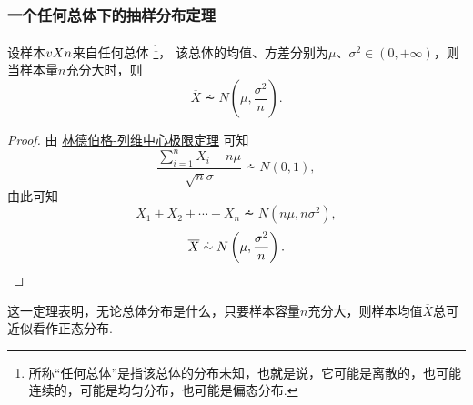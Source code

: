 \subsubsection{一个任何总体下的抽样分布定理}
\begin{theorem}
设样本\(v{X}{n}\)来自任何总体%
\footnote{所称“任何总体”是指该总体的分布未知，也就是说，它可能是离散的，也可能连续的，可能是均匀分布，也可能是偏态分布.}，%
该总体的均值、方差分别为\(\mu\)、\(\sigma^2\in(0,+\infty)\)，则当样本量\(n\)充分大时，则\begin{equation}
\overline{X} \dotsim N\left(\mu,\frac{\sigma^2}{n}\right).
\end{equation}
\begin{proof}
由 \hyperref[theorem:极限定理.林德伯格-列维中心极限定理]{林德伯格-列维中心极限定理} 可知\[
\frac{\sum\limits_{i=1}^n X_i - n\mu}{\sqrt{n} \sigma} \dotsim N(0,1),
\]由此可知\[
X_1+X_2+\dotsb+X_n \dotsim N(n\mu,n\sigma^2),
\]\[
\overline{X} \overset{.}{\sim} N\left(\mu,\frac{\sigma^2}{n}\right).
\qedhere
\]
\end{proof}
\end{theorem}
这一定理表明，无论总体分布是什么，只要样本容量\(n\)充分大，则样本均值\(\overline{X}\)总可近似看作正态分布.
